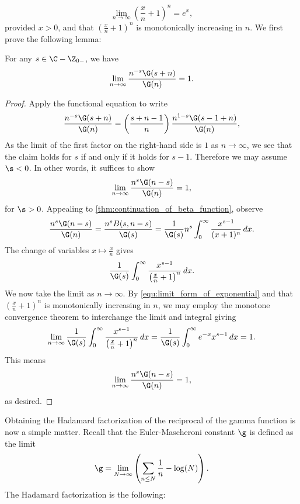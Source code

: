   \begin{equation}\label{equ:limit_form_of_exponential}
    \lim_{n \to \infty}\left(\frac{x}{n}+1\right)^{n} = e^{x},
  \end{equation}
  provided \(x > 0\), and that \(\left(\frac{x}{n}+1\right)^{n}\) is monotonically increasing in \(n\). We first prove the following lemma:

  \begin{lemma}\label{lem:Hadamard_factorization_of_gamma_function_lemma}
    For any \(s \in \C-\Z_{0-}\), we have
    \[
      \lim_{n \to \infty}\frac{n^{-s}\G(s+n)}{\G(n)} = 1.
    \]
  \end{lemma}
  \begin{proof}
    Apply the functional equation to write
    \[
      \frac{n^{-s}\G(s+n)}{\G(n)} = \left(\frac{s+n-1}{n}\right)\frac{n^{1-s}\G(s-1+n)}{\G(n)},
    \]
    As the limit of the first factor on the right-hand side is \(1\) as \(n \to \infty\), we see that the claim holds for \(s\) if and only if it holds for \(s-1\). Therefore we may assume \(\s < 0\). In other words, it suffices to show
    \[
      \lim_{n \to \infty}\frac{n^{s}\G(n-s)}{\G(n)} = 1,
    \]
    for \(\s > 0\). Appealing to \cref{thm:continuation_of_beta_function}, observe
    \[
      \frac{n^{s}\G(n-s)}{\G(n)} = \frac{n^{s}B(s,n-s)}{\G(s)} = \frac{1}{\G(s)}n^{s}\int_{0}^{\infty}\frac{x^{s-1}}{(x+1)^{n}}\,dx.
    \]
    The change of variables \(x \mapsto \frac{x}{n}\) gives
    \[ 
      \frac{1}{\G(s)}\int_{0}^{\infty}\frac{x^{s-1}}{\left(\frac{x}{n}+1\right)^{n}}\,dx.
    \]
    We now take the limit as \(n \to \infty\). By \cref{equ:limit_form_of_exponential} and that \(\left(\frac{x}{n}+1\right)^{n}\) is monotonically increasing in \(n\), we may employ the monotone convergence theorem to interchange the limit and integral giving
    \[
      \lim_{n \to \infty}\frac{1}{\G(s)}\int_{0}^{\infty}\frac{x^{s-1}}{\left(\frac{x}{n}+1\right)^{n}}\,dx = \frac{1}{\G(s)}\int_{0}^{\infty}e^{-x}x^{s-1}\,dx = 1.
    \]
    This means
    \[
      \lim_{n \to \infty}\frac{n^{s}\G(n-s)}{\G(n)} = 1,
    \]
    as desired.
  \end{proof}

  Obtaining the Hadamard factorization of the reciprocal of the gamma function is now a simple matter. Recall that the Euler-Mascheroni constant \(\g\) is defined as the limit
  \begin{equation}\label{equ:Euler-Mascheroni_constant_definition}
    \g = \lim_{N \to \infty}\left(\sum_{n \le N}\frac{1}{n}-\log(N)\right).
  \end{equation}
  The Hadamard factorization is the following:

